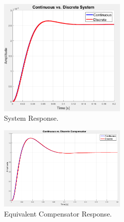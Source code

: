 \documentclass[11pt]{article}
\begin{document}
\begin{enumerate}[label=\textbf{\arabic*.}]
    \begin{figure}[H]
    \centering
    \includegraphics[width=0.55\textwidth]{capture.png}
    \caption{System Response.}
  \end{figure}
  \begin{figure}[H]
    \centering
    \includegraphics[width=0.55\textwidth]{p6.png}
    \caption{Equivalent Compensator Response.}
  \end{figure}

\end{enumerate}
\end{document}
